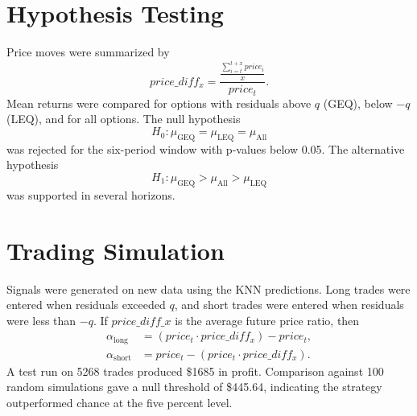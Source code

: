 \documentclass{article}
\begin{document}
\section{Hypothesis Testing}
Price moves were summarized by
\begin{equation*}
price\_diff_{x} = \frac{\frac{\sum_{i=t}^{t+x}{price_i}}{x}}{price_{t}}.
\end{equation*}
Mean returns were compared for options with residuals above $q$ (GEQ), below $-q$ (LEQ), and for all options. The null hypothesis
\begin{equation*}
H_0 : \mu_{\text{GEQ}} = \mu_{\text{LEQ}} = \mu_{\text{All}}
\end{equation*}
was rejected for the six-period window with p-values below 0.05. The alternative hypothesis
\begin{equation*}
H_1 : \mu_{\text{GEQ}} > \mu_{\text{All}} > \mu_{\text{LEQ}}
\end{equation*}
was supported in several horizons.
\section{Trading Simulation}
Signals were generated on new data using the KNN predictions. Long trades were entered when residuals exceeded $q$, and short trades were entered when residuals were less than $-q$. If $price\_diff\_x$ is the average future price ratio, then
\begin{align*}
\alpha_{\text{long}} &= (price_t \cdot price\_diff_x) - price_t,\\
\alpha_{\text{short}} &= price_t - (price_t \cdot price\_diff_x).
\end{align*}
A test run on 5268 trades produced \$1685 in profit. Comparison against 100 random simulations gave a null threshold of \$445.64, indicating the strategy outperformed chance at the five percent level.
\end{document}
